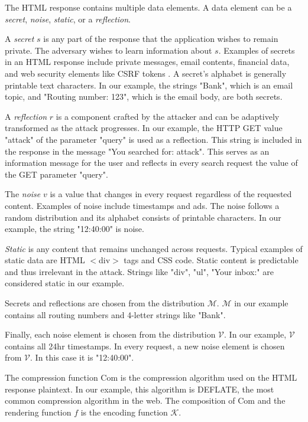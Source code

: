 \documentclass[conference, letterpaper, 10pt]{IEEEtran}
\begin{document}
The HTML response contains multiple data elements. A data element can be a
\textit{secret}, \textit{noise}, \textit{static}, or a \textit{reflection}.

A \textit{secret} $s$ is any part of the response that the application wishes to
remain private. The adversary wishes to learn information about $s$. Examples of
secrets in an HTML response include private messages, email contents, financial
data, and web security elements like CSRF tokens \cite{c5}. A secret's alphabet
is generally printable text characters. In our example, the strings "Bank",
which is an email topic, and "Routing number: 123", which is the email body, are
both secrets.

A \textit{reflection} $r$ is a component crafted by the attacker and can be
adaptively transformed as the attack progresses. In our example, the HTTP GET
value "attack" of the parameter "query" is used as a reflection. This string is
included in the response in the message "You searched for: attack". This serves
as an information message for the user and reflects in every search request the
value of the GET parameter "query".

The \textit{noise} $v$ is a value that changes in every request regardless of
the requested content. Examples of noise include timestamps and ads. The noise
follows a random distribution and its alphabet consists of printable characters.
In our example, the string "12:40:00" is noise.

\textit{Static} is any content that remains unchanged across requests. Typical
examples of static data are HTML $<$div$>$ tags and CSS code. Static content is
predictable and thus irrelevant in the attack. Strings like "div", "ul", "Your
inbox:" are considered static in our example.

Secrets and reflections are chosen from the distribution $\mathcal{M}$.
$\mathcal{M}$ in our example contains all routing numbers and 4-letter strings
like "Bank".

Finally, each noise element is chosen from the distribution $\mathcal{V}$. In
our example, $\mathcal{V}$ contains all 24hr timestamps. In every request, a new
noise element is chosen from $\mathcal{V}$. In this case it is "12:40:00".

The compression function $\textrm{Com}$ is the compression algorithm used on the
HTML response plaintext. In our example, this algorithm is DEFLATE, the most
common compression algorithm in the web. The composition of $\textrm{Com}$ and
the rendering function $f$ is the encoding function $\mathcal{K}$.
\end{document}
